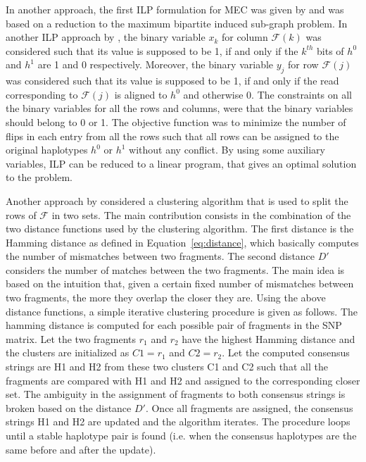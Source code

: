 In another approach, the first ILP formulation for MEC was given by \cite{Fouilhoux2012} and was based on a reduction to the maximum bipartite induced sub-graph problem. 
In another ILP approach by \cite{CDW13_exact}, the binary variable $x_k$ for column $\mathcal{F}(k)$ 
was considered such that its value is supposed to be 1, if and only if the $k^{th}$ bits of $h^0$ and $h^1$ are 1 and 0 respectively.
Moreover, the binary variable $y_j$ for row $\mathcal{F}(j)$ was considered such that its value is supposed to be 1, if and only 
if the read corresponding to $\mathcal{F}(j)$ is aligned to $h^0$ and otherwise 0.
The constraints on all the binary variables for all the rows and columns, were that the binary variables should belong to 0 or 1.
The objective function was to minimize the number of flips in each entry from all the rows such that all rows can be assigned to the original haplotypes $h^0$ or $h^1$ without any conflict. 
By using some auxiliary variables, ILP can be reduced to a linear program, that gives an optimal solution to the problem.

Another approach by \cite{wang2007clustering} considered a clustering algorithm that is used to split the rows of $\mathcal{F}$ in two sets. 
The main contribution consists in the combination of the two distance functions used by the clustering algorithm. 
The first distance is the Hamming distance as defined in Equation~\ref{eq:distance}, which basically computes the number of mismatches between two fragments. 
The second distance $D'$ considers the number of matches between the two fragments.
The main idea is based on the intuition that, given a certain fixed number of mismatches between two fragments, the more they overlap the closer they are.
Using the above distance functions, a simple iterative clustering procedure is given as follows.
The hamming distance is computed for each possible pair of fragments in the SNP matrix.
Let the two fragments $r_1$ and $r_2$ have the highest Hamming distance and the clusters are initialized as $C1 = r_1$ and $C2 = r_2$.
Let the computed consensus strings are H1 and H2 from these two clusters C1 and C2 such that all the fragments are compared with H1 and H2 and assigned to the corresponding closer set. The ambiguity in the assignment of fragments to both consensus strings is broken based on the distance $D'$.
Once all fragments are assigned, the consensus strings H1 and H2 are updated and the algorithm iterates. The procedure loops until a stable haplotype pair is found (i.e. when the consensus haplotypes are the same before and after the update).

